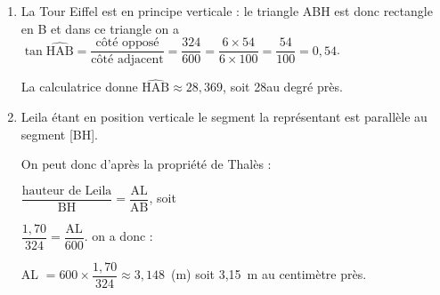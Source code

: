 
\medskip

%
%

\begin{enumerate}
\item %
La Tour Eiffel est en principe verticale : le triangle ABH est donc rectangle en B et dans ce triangle on a $\tan \widehat{\text{HAB}} = \dfrac{\text{côté opposé}}{\text{côté adjacent}} = \dfrac{324}{600} = \dfrac{6 \times 54}{6 \times 100} = \dfrac{54}{100} = 0,54$.

La calculatrice donne $\widehat{\text{HAB}} \approx 28,369$, soit 28\degres au degré près.
\item %
Leila étant en position verticale le segment la représentant est parallèle au segment [BH].

On peut donc d'après la propriété de Thalès :

$\dfrac{\text{hauteur de Leila}}{\text{BH}} = \dfrac{\text{AL}}{\text{AB}}$, soit

$\dfrac{1,70}{324} = \dfrac{\text{AL}}{600}$. on a donc :

AL $ = 600\times \dfrac{1,70}{324} \approx 3,148$~(m) soit 3,15~m au centimètre près.

\end{enumerate}


\bigskip

